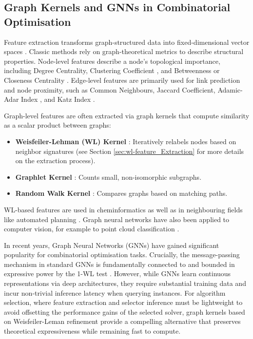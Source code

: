 \subsection{Graph Kernels and GNNs in Combinatorial Optimisation}
Feature extraction transforms graph-structured data into fixed-dimensional vector spaces \citep{graphkernels}. Classic methods rely on graph-theoretical metrics to describe structural properties. Node-level features describe a node's topological importance, including Degree Centrality, Clustering Coefficient \citep{watts1998collective}, and Betweenness or Closeness Centrality \citep{newman2010network}. Edge-level features are primarily used for link prediction and node proximity, such as Common Neighbours, Jaccard Coefficient, Adamic-Adar Index \citep{adamic2003friends}, and Katz Index \citep{katz1953status}.

Graph-level features are often extracted via graph kernels that compute similarity as a scalar product between graphs:
\begin{itemize}
    \item \textbf{Weisfeiler-Lehman (WL) Kernel} \citep{shervashidze2011weisfeiler}: Iteratively relabels nodes based on neighbor signatures (see Section \ref{sec:wl-feature_Extraction} for more details on the extraction process).
    \item \textbf{Graphlet Kernel} \citep{graphkernels}: Counts small, non-isomorphic subgraphs.
    \item \textbf{Random Walk Kernel} \citep{vishwanathan2010graph}: Compares graphs based on matching paths.
\end{itemize}
WL-based features are used in cheminformatics \citep{young2022literature} as well as in neighbouring fields like automated planning \citep{chen2024return}. Graph neural networks have also been applied to computer vision, for example to point cloud classification \citep{simonovsky2017dynamic}.

In recent years, Graph Neural Networks (GNNs) have gained significant popularity for combinatorial optimisation tasks. Crucially, the message-passing mechanism in standard GNNs is fundamentally connected to and bounded in expressive power by the 1-WL test \citep{Xuetal2018,morris2023weisfeiler}. However, while GNNs learn continuous representations via deep architectures, they require substantial training data and incur non-trivial inference latency when querying instances. For algorithm selection, where feature extraction and selector inference must be lightweight to avoid offsetting the performance gains of the selected solver, graph kernels based on Weisfeiler-Leman refinement provide a compelling alternative that preserves theoretical expressiveness while remaining fast to compute.
